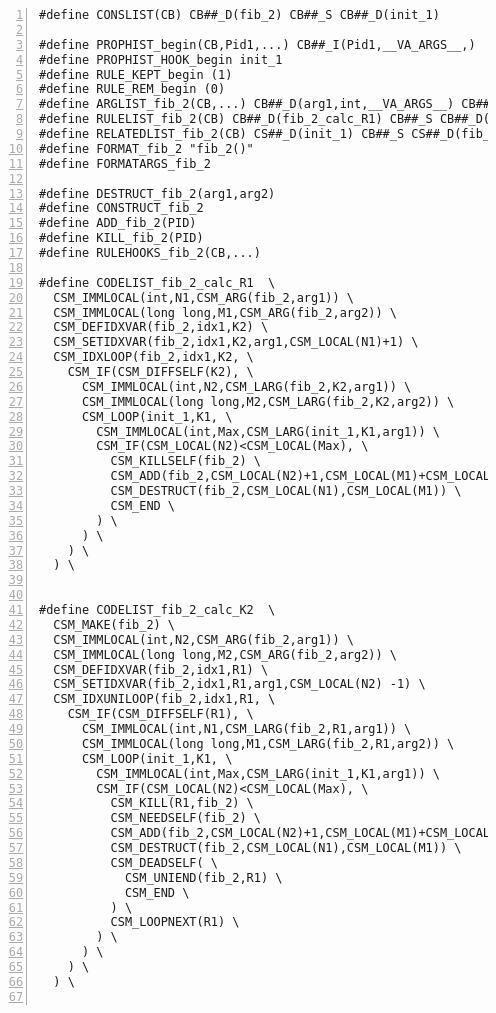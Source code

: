 {\scriptsize
\begin{Verbatim}[frame=single,numbers=left]
#define CONSLIST(CB) CB##_D(fib_2) CB##_S CB##_D(init_1)

#define PROPHIST_begin(CB,Pid1,...) CB##_I(Pid1,__VA_ARGS__,)
#define PROPHIST_HOOK_begin init_1
#define RULE_KEPT_begin (1)
#define RULE_REM_begin (0)
#define ARGLIST_fib_2(CB,...) CB##_D(arg1,int,__VA_ARGS__) CB##_S CB##_D(arg2,long long,__VA_ARGS__)
#define RULELIST_fib_2(CB) CB##_D(fib_2_calc_R1) CB##_S CB##_D(fib_2_calc_K2)
#define RELATEDLIST_fib_2(CB) CS##_D(init_1) CB##_S CS##_D(fib_2)
#define FORMAT_fib_2 "fib_2()"
#define FORMATARGS_fib_2 

#define DESTRUCT_fib_2(arg1,arg2) 
#define CONSTRUCT_fib_2 
#define ADD_fib_2(PID) 
#define KILL_fib_2(PID) 
#define RULEHOOKS_fib_2(CB,...) 

#define CODELIST_fib_2_calc_R1  \
  CSM_IMMLOCAL(int,N1,CSM_ARG(fib_2,arg1)) \
  CSM_IMMLOCAL(long long,M1,CSM_ARG(fib_2,arg2)) \
  CSM_DEFIDXVAR(fib_2,idx1,K2) \
  CSM_SETIDXVAR(fib_2,idx1,K2,arg1,CSM_LOCAL(N1)+1) \
  CSM_IDXLOOP(fib_2,idx1,K2, \
    CSM_IF(CSM_DIFFSELF(K2), \
      CSM_IMMLOCAL(int,N2,CSM_LARG(fib_2,K2,arg1)) \
      CSM_IMMLOCAL(long long,M2,CSM_LARG(fib_2,K2,arg2)) \
      CSM_LOOP(init_1,K1, \
        CSM_IMMLOCAL(int,Max,CSM_LARG(init_1,K1,arg1)) \
        CSM_IF(CSM_LOCAL(N2)<CSM_LOCAL(Max), \
          CSM_KILLSELF(fib_2) \
          CSM_ADD(fib_2,CSM_LOCAL(N2)+1,CSM_LOCAL(M1)+CSM_LOCAL(M2)) \
          CSM_DESTRUCT(fib_2,CSM_LOCAL(N1),CSM_LOCAL(M1)) \
          CSM_END \
        ) \
      ) \
    ) \
  ) \


#define CODELIST_fib_2_calc_K2  \
  CSM_MAKE(fib_2) \
  CSM_IMMLOCAL(int,N2,CSM_ARG(fib_2,arg1)) \
  CSM_IMMLOCAL(long long,M2,CSM_ARG(fib_2,arg2)) \
  CSM_DEFIDXVAR(fib_2,idx1,R1) \
  CSM_SETIDXVAR(fib_2,idx1,R1,arg1,CSM_LOCAL(N2) -1) \
  CSM_IDXUNILOOP(fib_2,idx1,R1, \
    CSM_IF(CSM_DIFFSELF(R1), \
      CSM_IMMLOCAL(int,N1,CSM_LARG(fib_2,R1,arg1)) \
      CSM_IMMLOCAL(long long,M1,CSM_LARG(fib_2,R1,arg2)) \
      CSM_LOOP(init_1,K1, \
        CSM_IMMLOCAL(int,Max,CSM_LARG(init_1,K1,arg1)) \
        CSM_IF(CSM_LOCAL(N2)<CSM_LOCAL(Max), \
          CSM_KILL(R1,fib_2) \
          CSM_NEEDSELF(fib_2) \
          CSM_ADD(fib_2,CSM_LOCAL(N2)+1,CSM_LOCAL(M1)+CSM_LOCAL(M2)) \
          CSM_DESTRUCT(fib_2,CSM_LOCAL(N1),CSM_LOCAL(M1)) \
          CSM_DEADSELF( \
            CSM_UNIEND(fib_2,R1) \
            CSM_END \
          ) \
          CSM_LOOPNEXT(R1) \
        ) \
      ) \
    ) \
  ) \


\end{Verbatim}}
